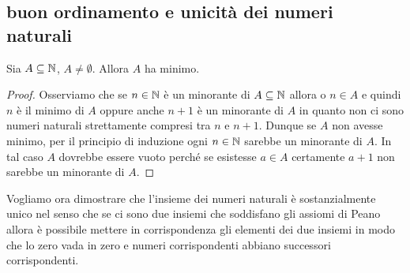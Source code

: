 \subsection{buon ordinamento e unicità dei numeri naturali}

\begin{theorem}
  \label{th:buon_ordinamento}
  Sia $A\subseteq {\mathbb N}$, $A\neq \emptyset$. 
  Allora $A$ ha minimo.
\end{theorem}
%
\begin{proof}
  Osserviamo che se $n\in {\mathbb N}$ è un minorante di $A\subseteq {\mathbb N}$ 
  allora o $n\in A$ e quindi $n$ è il minimo di $A$
  oppure anche $n+1$ è un minorante di $A$ in quanto 
  non ci sono numeri naturali strettamente compresi tra $n$ e $n+1$.
  Dunque se $A$ non avesse minimo, per il principio di induzione 
  ogni $n\in{\mathbb N}$ sarebbe un minorante di $A$.
  In tal caso $A$ dovrebbe essere vuoto perché se esistesse $a\in A$ 
  certamente $a+1$ non sarebbe un minorante di $A$.
\end{proof}

Vogliamo ora dimostrare che l'insieme dei numeri naturali è sostanzialmente 
unico nel senso che se ci sono due insiemi che soddisfano gli assiomi di 
Peano allora è possibile mettere in corrispondenza gli elementi dei due insiemi 
in modo che lo zero vada in zero e numeri corrispondenti abbiano successori 
corrispondenti.

